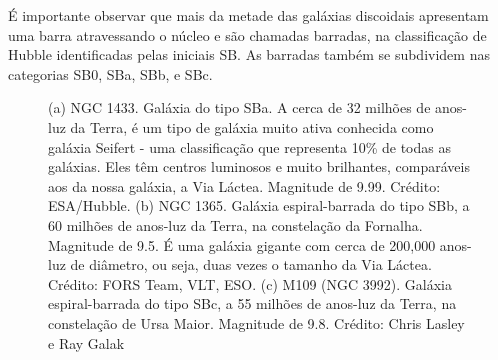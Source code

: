 É importante observar que mais da metade das galáxias discoidais apresentam uma barra atravessando o núcleo e são chamadas barradas, na classificação de Hubble identificadas pelas iniciais SB. As barradas também se subdividem nas categorias SB0, SBa, SBb, e SBc.  

\begin{figure}[ht!] 
\centering 
{} 
\qquad 
{} 
\qquad 
{} 
\caption{(a) NGC 1433. Galáxia do tipo SBa. A cerca de 32 milhões de anos-luz da Terra, é um tipo de galáxia muito ativa conhecida como galáxia Seifert - uma classificação que representa 10\% de todas as galáxias. Eles têm centros luminosos e muito brilhantes, comparáveis aos da nossa galáxia, a Via Láctea. Magnitude de 9.99. Crédito: ESA/Hubble. \newline (b) NGC 1365. Galáxia espiral-barrada do tipo SBb, a 60 milhões de anos-luz da Terra, na constelação da Fornalha. Magnitude de 9.5. É uma galáxia gigante com cerca de 200,000 anos-luz de diâmetro, ou seja, duas vezes o tamanho da Via Láctea. Crédito: FORS Team, VLT, ESO. \newline (c) M109 (NGC 3992). Galáxia espiral-barrada do tipo SBc, a 55 milhões de anos-luz da Terra, na constelação de Ursa Maior. Magnitude de 9.8. Crédito: Chris Lasley e Ray Galak} 
\label{fig:galáxias5} 
\end{figure} 

